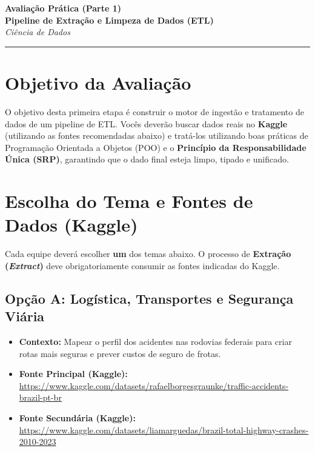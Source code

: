 \documentclass[12pt,a4paper]{article}
\begin{document}
	
	\noindent
	\begin{center}
		\LARGE \textbf{Avaliação Prática (Parte 1)} \\
		\vspace{0.2cm}
		\large \textbf{Pipeline de Extração e Limpeza de Dados (ETL)} \\
		\vspace{0.4cm}
		\normalsize \textit{Ciência de Dados} \\
	\end{center}
	
	\vspace{0.2cm}
	\noindent\rule{\textwidth}{0.4pt}
	\vspace{0.5cm}
	
	\section{Objetivo da Avaliação}
	O objetivo desta primeira etapa é construir o motor de ingestão e tratamento de dados de um pipeline de ETL. Vocês deverão buscar dados reais no \textbf{Kaggle} (utilizando as fontes recomendadas abaixo) e tratá-los utilizando boas práticas de Programação Orientada a Objetos (POO) e o \textbf{Princípio da Responsabilidade Única (SRP)}, garantindo que o dado final esteja limpo, tipado e unificado.
	
	\section{Escolha do Tema e Fontes de Dados (Kaggle)}
	Cada equipe deverá escolher \textbf{um} dos temas abaixo. O processo de \textbf{Extração (\textit{Extract})} deve obrigatoriamente consumir as fontes indicadas do Kaggle.
	
	\subsection*{Opção A: Logística, Transportes e Segurança Viária}
	\begin{itemize}
		\item \textbf{Contexto:} Mapear o perfil dos acidentes nas rodovias federais para criar rotas mais seguras e prever custos de seguro de frotas.
		\item \textbf{Fonte Principal (Kaggle):} \\
		\url{https://www.kaggle.com/datasets/rafaelborgesgraunke/traffic-accidents-brazil-pt-br}
		\item \textbf{Fonte Secundária (Kaggle):} \\
		\url{https://www.kaggle.com/datasets/liamarguedas/brazil-total-highway-crashes-2010-2023}
	\end{itemize}
	
\end{document}
